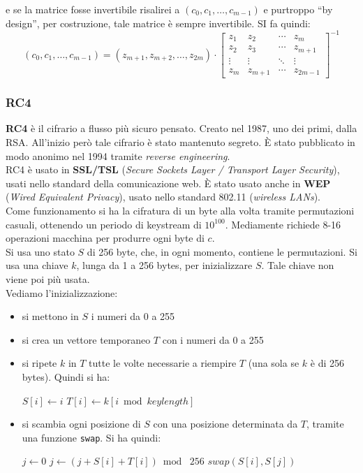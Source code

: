 \documentclass[a4paper,12pt, oneside]{book}
\begin{document}
e se la matrice fosse invertibile risalirei a $(c_0,c_1,\ldots,c_{m-1})$ e
purtroppo ``by design'', per costruzione, tale matrice è sempre invertibile. SI
fa quindi:
\[(c_0,c_1,\ldots,c_{m-1})=(z_{m+1},z_{m+2},\ldots, z_{2m})\cdot
  \left[
    \begin{matrix}
      z_1 & z_2 &\cdots &z_m\\
      z_2 & z_3 &\cdots &z_{m+1}\\
      \vdots & \vdots &\ddots &\vdots\\
      z_m & z_{m+1} &\cdots &z_{2m-1}
    \end{matrix}
  \right]^{-1}
\]
\subsubsection{RC4}
\textbf{RC4} è il cifrario a flusso più sicuro pensato. Creato nel 1987, uno dei
primi, dalla RSA. All'inizio però tale cifrario è stato mantenuto segreto. È
stato pubblicato in modo anonimo nel 1994 tramite \textit{reverse
  engineering}.\\
RC4 è usato in \textbf{SSL/TSL} (\textit{Secure Sockets Layer / Transport Layer
  Security}), usati nello standard della comunicazione web. È stato usato anche
in \textbf{WEP} (\textit{Wired Equivalent Privacy}), usato nello standard 802.11
(\textit{wireless LANs}).\\
Come funzionamento si ha la cifratura di un byte alla volta tramite permutazioni
casuali, ottenendo un periodo di keystream di $10^{100}$. Mediamente richiede
8-16 operazioni macchina per produrre ogni byte di $c$.\\
Si usa uno stato $S$ di 256 byte, che, in ogni momento, contiene le
permutazioni. Si usa una chiave $k$, lunga da 1 a 256 bytes, per inizializzare
$S$. Tale chiave non viene poi più usata.\\
Vediamo l'inizializzazione:
\begin{itemize}
  \item si mettono in $S$ i numeri da 0 a 255
  \item si crea un vettore temporaneo $T$ con i numeri da 0 a 255
  \item si ripete $k$ in $T$ tutte le volte necessarie a riempire $T$ (una sola
  se $k$ è di 256 bytes). Quindi si ha:
  \begin{algorithmic}
    \State $S[i]\gets i$
    \State $T[i]\gets k[i\bmod keylength]$
    \EndFor
  \end{algorithmic}
  \item si scambia ogni posizione di $S$ con una posizione determinata da $T$,
  tramite una funzione \texttt{swap}. Si ha quindi:
  \begin{algorithmic}
    \State $j\gets 0$
    \State $j\gets (j+S[i]+T[i])\bmod\,\,256$
    \State $swap(S[i],S[j])$
    \EndFor
  \end{algorithmic}
\end{itemize}
\end{document}
